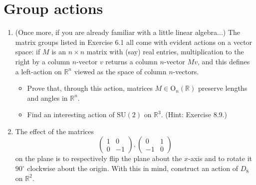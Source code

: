 \section{Group actions}
\begin{enumerate}
    \item (Once more, if you are already familiar with a little linear algebra...) The matrix groups listed in Exercise 6.1 all come with evident actions on a vector space: if $M$ is an $n \times n$ matrix with (say) real entries, multiplication to the right by a column $n$-vector $v$ returns a column $n$-vector $Mv$, and this defines a left-action on $\mathbb{R}^n$ viewed as the space of column $n$-vectors.
          \begin{itemize}
              \item Prove that, through this action, matrices $M \in \text{O}_n(\mathbb{R})$ preserve lengths and angles in $\mathbb{R}^n$.
              \item Find an interesting action of $\text{SU}(2)$ on $\mathbb{R}^3$. (Hint: Exercise 8.9.)
          \end{itemize}

    \item The effect of the matrices
          \[ \begin{pmatrix} 1 & 0 \\ 0 & -1 \end{pmatrix}, \begin{pmatrix} 0 & 1 \\ -1 & 0 \end{pmatrix} \]
          on the plane is to respectively flip the plane about the $x$-axis and to rotate it $90^\circ$ clockwise about the origin. With this in mind, construct an action of $D_8$ on $\mathbb{R}^2$.


\end{enumerate}
